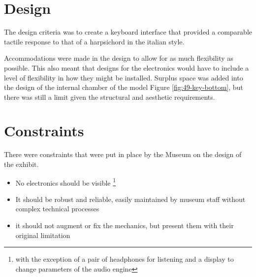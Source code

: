 \section{Design}

The design criteria was to create a keyboard interface that provided a comparable tactile response to that of a harpsichord in the italian style.

Accommodations were made in the design to allow for as much flexibility as possible. 
This also meant that designs for the electronics would have to include a level of flexibility in how they might be installed. 
Surplus space was added into the design of the internal chamber of the model Figure \ref{fig:49-key-bottom}, but there was still a limit given the structural
and aesthetic requirements.

\section{Constraints}\label{design-problem}





There were constraints that were put in place by the Museum on the design of the exhibit.

\begin{itemize}
\item
  No electronics should be visible \footnote{with the exception of a pair of headphones for listening and a display to change parameters of the audio engine}
\item
  It should be robust and reliable, easily maintained by museum staff without complex technical processes
\item
  it should not augment or fix the mechanics, but present them with their original limitation
\end{itemize}

